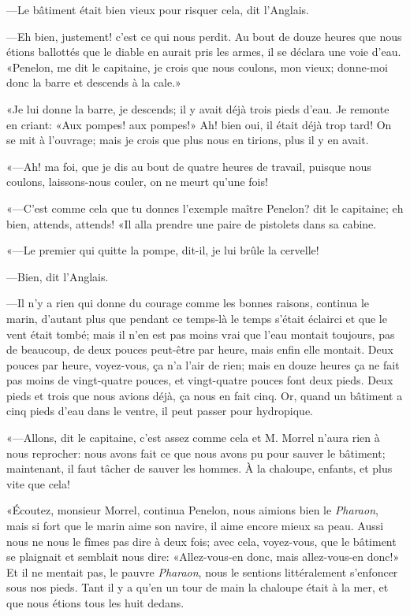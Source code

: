 —Le bâtiment était bien vieux pour risquer cela, dit l'Anglais.

—Eh bien, justement! c'est ce qui nous perdit. Au bout de douze heures que nous étions ballottés que le diable en aurait pris les armes, il se déclara une voie d'eau. «Penelon, me dit le capitaine, je crois que nous coulons, mon vieux; donne-moi donc la barre et descends à la cale.»

«Je lui donne la barre, je descends; il y avait déjà trois pieds d'eau. Je remonte en criant: «Aux pompes! aux pompes!» Ah! bien oui, il était déjà trop tard! On se mit à l'ouvrage; mais je crois que plus nous en tirions, plus il y en avait.

«—Ah! ma foi, que je dis au bout de quatre heures de travail, puisque nous coulons, laissons-nous couler, on ne meurt qu'une fois!

«—C'est comme cela que tu donnes l'exemple maître Penelon? dit le capitaine; eh bien, attends, attends! «Il alla prendre une paire de pistolets dans sa cabine.

«—Le premier qui quitte la pompe, dit-il, je lui brûle la cervelle!

—Bien, dit l'Anglais.

—Il n'y a rien qui donne du courage comme les bonnes raisons, continua le marin, d'autant plus que pendant ce temps-là le temps s'était éclairci et que le vent était tombé; mais il n'en est pas moins vrai que l'eau montait toujours, pas de beaucoup, de deux pouces peut-être par heure, mais enfin elle montait. Deux pouces par heure, voyez-vous, ça n'a l'air de rien; mais en douze heures ça ne fait pas moins de vingt-quatre pouces, et vingt-quatre pouces font deux pieds. Deux pieds et trois que nous avions déjà, ça nous en fait cinq. Or, quand un bâtiment a cinq pieds d'eau dans le ventre, il peut passer pour hydropique.

«—Allons, dit le capitaine, c'est assez comme cela et M. Morrel n'aura rien à nous reprocher: nous avons fait ce que nous avons pu pour sauver le bâtiment; maintenant, il faut tâcher de sauver les hommes. À la chaloupe, enfants, et plus vite que cela!

«Écoutez, monsieur Morrel, continua Penelon, nous aimions bien le \textit{Pharaon}, mais si fort que le marin aime son navire, il aime encore mieux sa peau. Aussi nous ne nous le fîmes pas dire à deux fois; avec cela, voyez-vous, que le bâtiment se plaignait et semblait nous dire: «Allez-vous-en donc, mais allez-vous-en donc!» Et il ne mentait pas, le pauvre \textit{Pharaon}, nous le sentions littéralement s'enfoncer sous nos pieds. Tant il y a qu'en un tour de main la chaloupe était à la mer, et que nous étions tous les huit dedans.

